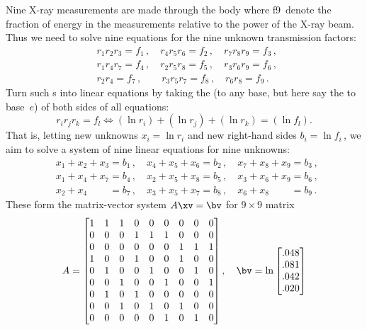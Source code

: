 \begin{example}
\begin{solution} 
Nine X-ray measurements are made through the body where \hlist f9\ denote the fraction of energy in the measurements relative to the power of the X-ray beam.
Thus we need to solve nine equations for the nine unknown transmission factors:
\begin{eqnarray*}
&&
r_1r_2r_3=f_1\,,\quad
r_4r_5r_6=f_2\,,\quad
r_7r_8r_9=f_3\,,\quad
\\&&
r_1r_4r_7=f_4\,,\quad
r_2r_5r_8=f_5\,,\quad
r_3r_6r_9=f_6\,,\quad
\\&&
r_2r_4=f_7\,,\qquad
r_3r_5r_7=f_8\,,\quad
r_6r_8=f_9\,.\quad
\end{eqnarray*}
Turn such s into linear equations by taking the 
 (to any base, but here say the  to base~\(e\)) of both sides of all equations:
\begin{equation*}
r_ir_jr_k=f_l \iff (\ln r_i)+(\ln r_j)+(\ln r_k)=(\ln f_l).
\end{equation*}
That is, letting new unknowns \(x_i=\ln r_i\) and new right-hand sides \(b_i=\ln f_i\)\,, we aim to solve a system of nine linear equations for nine unknowns:
\begin{eqnarray*}&&
x_1+x_2+x_3=b_1\,,\quad
x_4+x_5+x_6=b_2\,,\quad
x_7+x_8+x_9=b_3\,,
\\&&
x_1+x_4+x_7=b_4\,,\quad
x_2+x_5+x_8=b_5\,,\quad
x_3+x_6+x_9=b_6\,,\quad
\\&&
x_2+x_4\phantom{{}+x_4}=b_7\,,\quad
x_3+x_5+x_7=b_8\,,\quad
x_6+x_8\phantom{{}+x_4}=b_9\,.
\end{eqnarray*}
These form the matrix-vector system \(A\xv=\bv\) for \(9\times9\) matrix
\begin{equation*}
A=\begin{bmatrix} 
 1&1&1&0&0&0&0&0&0 \\
 0&0&0&1&1&1&0&0&0 \\
 0&0&0&0&0&0&1&1&1 \\
 1&0&0&1&0&0&1&0&0 \\
 0&1&0&0&1&0&0&1&0 \\
 0&0&1&0&0&1&0&0&1 \\
 0&1&0&1&0&0&0&0&0 \\
 0&0&1&0&1&0&1&0&0 \\
 0&0&0&0&0&1&0&1&0 \end{bmatrix},\quad
 \bv=\ln\begin{bmatrix} .048
\\ .081
\\ .042
\\ .020

\end{bmatrix}
\end{equation*}
\end{solution}
\end{example}
